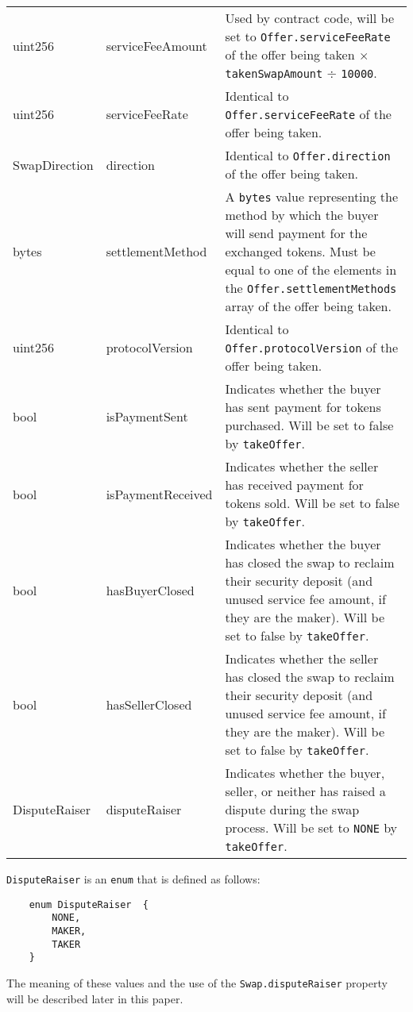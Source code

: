 \documentclass[11pt]{article}
\begin{document}
\begin{longtable}[p]{ |p{2.5cm}|p{4cm}|p{7cm}| }
        uint256 & serviceFeeAmount & Used by contract code, will be set to \verb|Offer.serviceFeeRate| of the offer being taken $\times$ \verb|takenSwapAmount| $\div$ \verb|10000|.\\
        uint256 & serviceFeeRate & Identical to \verb|Offer.serviceFeeRate| of the offer being taken. \\
        SwapDirection & direction & Identical to \verb|Offer.direction| of the offer being taken. \\
        bytes & settlementMethod & A \verb|bytes| value representing the method by which the buyer will send payment for the exchanged tokens.
        Must be equal to one of the elements in the \verb|Offer.settlementMethods| array of the offer being taken. \\
        uint256 & protocolVersion & Identical to \verb|Offer.protocolVersion| of the offer being taken. \\
        bool & isPaymentSent & Indicates whether the buyer has sent payment for tokens purchased.
        Will be set to false by \verb|takeOffer|. \\
        bool & isPaymentReceived & Indicates whether the seller has received payment for tokens sold.
        Will be set to false by \verb|takeOffer|. \\
        bool & hasBuyerClosed & Indicates whether the buyer has closed the swap to reclaim their security deposit (and unused service fee amount, if they are the maker).
        Will be set to false by \verb|takeOffer|. \\
        bool & hasSellerClosed & Indicates whether the seller has closed the swap to reclaim their security deposit (and unused service fee amount, if they are the maker).
        Will be set to false by \verb|takeOffer|. \\
        DisputeRaiser & disputeRaiser & Indicates whether the buyer, seller, or neither has raised a dispute during the swap process.
        Will be set to \verb|NONE| by \verb|takeOffer|. \\
        \hline
    \end{longtable}
    \verb|DisputeRaiser| is an \verb|enum| that is defined as follows:
    \begin{verbatim}
    enum DisputeRaiser  {
        NONE,
        MAKER,
        TAKER
    }
    \end{verbatim}
    The meaning of these values and the use of the \verb|Swap.disputeRaiser| property will be
    described later in this paper.
\end{document}
